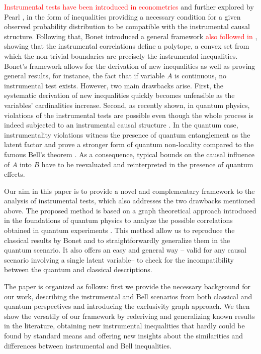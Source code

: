 \documentclass[letterpaper]{article}
\begin{document}
\textcolor{red}{Instrumental tests have been introduced in econometrics \cite{Wooldridge2015}} and further explored by Pearl \cite{pearl1995}, in the form of inequalities providing a necessary condition for a given observed
probability distribution to be compatible with the instrumental causal
structure. Following that, Bonet \cite{bonet2001} introduced a general
framework \textcolor{red}{also followed in \cite{Ramsahai2012}}, showing that the instrumental correlations define a polytope, a
convex set from which the non-trivial boundaries are precisely the instrumental
inequalities. Bonet's framework allows for the derivation of new inequalities
as well as proving general results, for instance, the fact that if variable $A$
is continuous, no instrumental test exists. However, two main drawbacks arise. First, the systematic derivation of new inequalities quickly becomes
unfeasible as the variables' cardinalities increase. Second, as recently shown,
in quantum physics, violations of the instrumental tests are possible even
though the whole process is indeed subjected to an instrumental causal structure
\cite{chaves2018, himbeeck2018}. In the quantum case, instrumentality violations
witness the presence of quantum entanglement as the latent factor and prove a
stronger form of quantum non-locality compared to the famous Bell's theorem
\cite{chaves2018}. As a consequence, typical bounds on the causal influence of
$A$ into $B$ have to be reevaluated and reinterpreted in the presence of quantum
effects.

Our aim in this paper is to provide a novel and complementary framework to the
analysis of instrumental tests, which also addresses the two drawbacks mentioned
above. The proposed method is based on a graph theoretical approach introduced
in the foundations of quantum physics to analyze the possible correlations
obtained in quantum experiments \cite{cabello2014,rabelo2014}. This method allow us to reproduce the classical results by Bonet and to straightforwardly generalize them in the quantum scenario. It also offers an easy and general way -- valid for any causal scenario involving a single latent variable-- to check for the incompatibility between the
quantum and classical descriptions.

The paper is organized as follows: first we provide the necessary background for our work, describing the instrumental and Bell scenarios from both classical and quantum perspectives and introducing the exclusivity graph approach. We then show the versatily of our framework by rederiving and generalizing known results in the literature, obtaining new instrumental inequalities that hardly could be found by standard means and offering new insights about the similarities and differences between instrumental and Bell inequalities.
\end{document}
